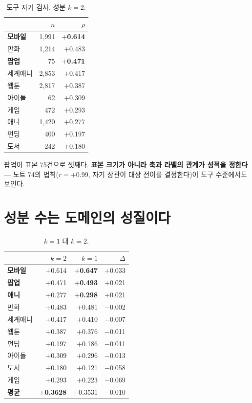 \documentclass[10pt]{article}
\begin{document}
\begin{table}[t]
\centering\tsize
\caption{도구 자기 검사. 성분 $k{=}2$.}
\begin{tabular}{lrr}
\toprule
& $n$ & $\rho$ \\
\midrule
\textbf{모바일} & 1,991 & \textbf{$+$0.614} \\
만화 & 1,214 & $+$0.483 \\
\textbf{팝업} & 75 & \textbf{$+$0.471} \\
세계애니 & 2,853 & $+$0.417 \\
웹툰 & 2,817 & $+$0.387 \\
\midrule
아이돌 & 62 & $+$0.309 \\
게임 & 472 & $+$0.293 \\
애니 & 1,420 & $+$0.277 \\
펀딩 & 400 & $+$0.197 \\
도서 & 242 & $+$0.180 \\
\bottomrule
\end{tabular}
\end{table}


팝업이 표본 75건으로 셋째다. \textbf{표본 크기가 아니라 축과 라벨의 관계가
성적을 정한다} --- 노트 74의 법칙($r=+$0.99, 자기 상관이 대상 전이를 결정한다)이
도구 수준에서도 보인다.

\section{성분 수는 도메인의 성질이다}

\begin{table}[t]
\centering\tsize
\caption{$k{=}1$ 대 $k{=}2$.}
\begin{tabular}{lrrr}
\toprule
& $k{=}2$ & $k{=}1$ & $\Delta$ \\
\midrule
\textbf{모바일} & $+$0.614 & \textbf{$+$0.647} & $+$0.033 \\
\textbf{팝업} & $+$0.471 & \textbf{$+$0.493} & $+$0.021 \\
\textbf{애니} & $+$0.277 & \textbf{$+$0.298} & $+$0.021 \\
만화 & $+$0.483 & $+$0.481 & $-$0.002 \\
세계애니 & $+$0.417 & $+$0.410 & $-$0.007 \\
웹툰 & $+$0.387 & $+$0.376 & $-$0.011 \\
펀딩 & $+$0.197 & $+$0.186 & $-$0.011 \\
아이돌 & $+$0.309 & $+$0.296 & $-$0.013 \\
도서 & $+$0.180 & $+$0.121 & $-$0.058 \\
게임 & $+$0.293 & $+$0.223 & $-$0.069 \\
\midrule
\textbf{평균} & \textbf{$+$0.3628} & $+$0.3531 & $-$0.010 \\
\bottomrule
\end{tabular}
\end{table}
\end{document}
